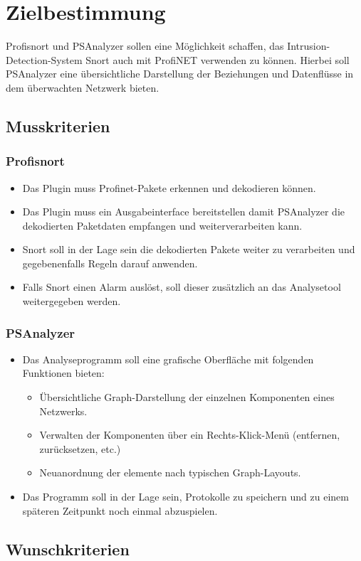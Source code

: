 \chapter{Zielbestimmung}

Profisnort und PSAnalyzer sollen eine Möglichkeit schaffen, das Intrusion-Detection-System Snort auch mit ProfiNET verwenden zu können.
Hierbei soll PSAnalyzer eine übersichtliche Darstellung der Beziehungen und Datenflüsse in dem überwachten Netzwerk bieten.

\section{Musskriterien}

\subsection{Profisnort}
\begin{itemize}
  \item Das Plugin muss Profinet-Pakete erkennen und dekodieren können.
  \item Das Plugin muss ein Ausgabeinterface bereitstellen damit PSAnalyzer die dekodierten Paketdaten empfangen und weiterverarbeiten kann.
  \item Snort soll in der Lage sein die dekodierten Pakete weiter zu verarbeiten und gegebenenfalls Regeln darauf anwenden.
  \item Falls Snort einen Alarm auslöst, soll dieser zusätzlich an das Analysetool weitergegeben werden.
\end{itemize}

\subsection{PSAnalyzer}
\begin{itemize}
  \item Das Analyseprogramm soll eine grafische Oberfläche mit folgenden Funktionen bieten:
  \begin{itemize}
    \item Übersichtliche Graph-Darstellung der einzelnen Komponenten eines Netzwerks.
    \item Verwalten der Komponenten über ein Rechts-Klick-Menü (entfernen, zurücksetzen, etc.)
    \item Neuanordnung der elemente nach typischen Graph-Layouts.
  \end{itemize}
  \item Das Programm soll in der Lage sein, Protokolle zu speichern und zu einem späteren Zeitpunkt noch einmal abzuspielen.
\end{itemize}

\section{Wunschkriterien} 
